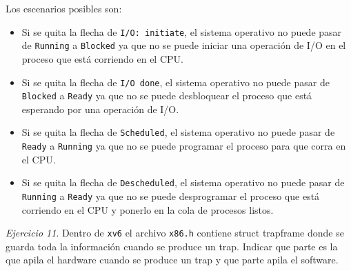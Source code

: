 \documentclass[12pt]{article}
\begin{document}
\begin{rta}
    Los escenarios posibles son:
    \begin{itemize}
        \item Si se quita la flecha de \texttt{I/O: initiate}, el sistema operativo no puede pasar de \texttt{Running} a \texttt{Blocked} ya que no se puede iniciar una operación de I/O en el proceso que está corriendo en el CPU.
        \item Si se quita la flecha de \texttt{I/O done}, el sistema operativo no puede pasar de \texttt{Blocked} a \texttt{Ready} ya que no se puede desbloquear el proceso que está esperando por una operación de I/O.
        \item Si se quita la flecha de \texttt{Scheduled}, el sistema operativo no puede pasar de \texttt{Ready} a \texttt{Running} ya que no se puede programar el proceso para que corra en el CPU.
        \item Si se quita la flecha de \texttt{Descheduled}, el sistema operativo no puede pasar de \texttt{Running} a \texttt{Ready} ya que no se puede desprogramar el proceso que está corriendo en el CPU y ponerlo en la cola de procesos listos.
    \end{itemize}
\end{rta}

\noindent \textit{Ejercicio 11}. Dentro de \texttt{xv6} el archivo \texttt{x86.h} contiene struct trapframe donde se guarda toda la información cuando se produce un trap. Indicar que parte es la que apila el hardware cuando se produce un trap y que parte apila el software.
\end{document}
